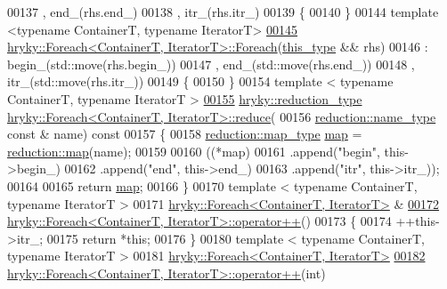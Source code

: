 \begin{DoxyCode}
00137       , end\_(rhs.end\_)
00138       , itr\_(rhs.itr\_)
00139 \{
00140 \}
00144 \textcolor{keyword}{template} <\textcolor{keyword}{typename} ContainerT, \textcolor{keyword}{typename} IteratorT>
\hypertarget{foreach_8h_source_l00145}{}\hyperlink{classhryky_1_1_foreach_a135d90ee04a04f300032795ef9ed095d}{00145} \hyperlink{classhryky_1_1_foreach}{hryky::Foreach<ContainerT, IteratorT>::Foreach}(\hyperlink{classhryky_1_1_foreach}{this_type} && rhs)
00146     : begin\_(std::move(rhs.begin\_))
00147       , end\_(std::move(rhs.end\_))
00148       , itr\_(std::move(rhs.itr\_))
00149 \{
00150 \}
00154 \textcolor{keyword}{template} < \textcolor{keyword}{typename} ContainerT, \textcolor{keyword}{typename} IteratorT >
\hypertarget{foreach_8h_source_l00155}{}\hyperlink{classhryky_1_1_foreach_a13a52462dd8b0dddf02ea2784517bf7a}{00155} \hyperlink{classhryky_1_1_intrusive_ptr}{hryky::reduction_type} \hyperlink{namespacehryky_af41cb3af6766761da0ff21b84527a52c}{hryky::Foreach<ContainerT, IteratorT>::reduce}(
00156     \hyperlink{classhryky_1_1reduction_1_1_string}{reduction::name_type} \textcolor{keyword}{const} & name)\textcolor{keyword}{ const}
00157 \textcolor{keyword}{}\{
00158     \hyperlink{classhryky_1_1_intrusive_ptr}{reduction::map_type} \hyperlink{namespacehryky_1_1reduction_ac5eae270cf8047b294dc4ff3e5e11a79}{map} = \hyperlink{namespacehryky_1_1reduction_ac5eae270cf8047b294dc4ff3e5e11a79}{reduction::map}(name);
00159 
00160     ((*map)
00161      .append(\textcolor{stringliteral}{"begin"}, this->begin\_)
00162      .append(\textcolor{stringliteral}{"end"}, this->end\_)
00163      .append(\textcolor{stringliteral}{"itr"}, this->itr\_));
00164     
00165     \textcolor{keywordflow}{return} \hyperlink{namespacehryky_1_1reduction_ac5eae270cf8047b294dc4ff3e5e11a79}{map};
00166 \}
00170 \textcolor{keyword}{template} < \textcolor{keyword}{typename} ContainerT, \textcolor{keyword}{typename} IteratorT >
00171 \hyperlink{classhryky_1_1_foreach}{hryky::Foreach<ContainerT, IteratorT>} & 
\hypertarget{foreach_8h_source_l00172}{}\hyperlink{classhryky_1_1_foreach_a630beb6360fa3cabbb602d80cd5f5b44}{00172} \hyperlink{classhryky_1_1_foreach}{hryky::Foreach<ContainerT, IteratorT>::operator++}()
00173 \{
00174     ++this->itr\_;
00175     \textcolor{keywordflow}{return} *\textcolor{keyword}{this};
00176 \}
00180 \textcolor{keyword}{template} < \textcolor{keyword}{typename} ContainerT, \textcolor{keyword}{typename} IteratorT >
00181 \hyperlink{classhryky_1_1_foreach}{hryky::Foreach<ContainerT, IteratorT>}
\hypertarget{foreach_8h_source_l00182}{}\hyperlink{classhryky_1_1_foreach_a1e142eef50ffce824c28e6d0ede15c63}{00182} \hyperlink{classhryky_1_1_foreach}{hryky::Foreach<ContainerT, IteratorT>::operator++}(\textcolor{keywordtype}{int})

\end{DoxyCode}
